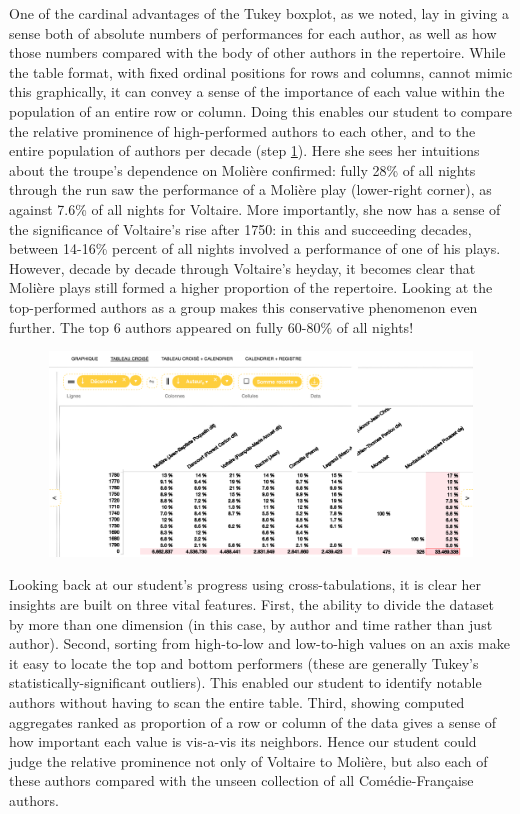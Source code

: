 \documentclass[	DIV=calc,%
							paper=a4,%
							fontsize=11pt,%
							twocolumn]{scrartcl}	 					%
\begin{document}
One of the cardinal advantages of the Tukey boxplot, as we noted, lay in giving a sense both of absolute numbers of performances for each author, as well as how those numbers compared with the body of other authors in the repertoire.  While the table format, with fixed ordinal positions for rows and columns, cannot mimic this graphically, it can convey a sense of the importance of each value within the population of an entire row or column.  Doing this enables our student to compare the relative prominence of high-performed authors to each other, and to the entire population of authors per decade (step \ref{fig:percents}).  Here she sees her intuitions about the troupe’s dependence on Molière confirmed: fully 28\% of all nights through the run saw the performance of a Molière play (lower-right corner), as against 7.6\% of all nights for Voltaire.  More importantly, she now has a sense of the significance of Voltaire’s rise after 1750: in this and succeeding decades, between 14-16\% percent of all nights involved a performance of one of his plays.  However, decade by decade through Voltaire’s heyday, it becomes clear that Molière plays still formed a higher proportion of the repertoire.  Looking at the top-performed authors as a group makes this conservative phenomenon even further.  The top 6 authors appeared on fully 60-80\% of all nights!

\begin{figure}
  \centering
	\includegraphics[width=7in]{steps/percents.png}
	\caption{}
	\label{fig:percents}
\end{figure}

Looking back at our student’s progress using cross-tabulations, it is clear her insights are built on three vital features.  First, the ability to divide the dataset by more than one dimension (in this case, by author and time rather than just author).  Second, sorting from high-to-low and low-to-high values on an axis make it easy to locate the top and bottom performers (these are generally Tukey’s statistically-significant outliers).  This enabled our student to identify notable authors without having to scan the entire table. Third, showing computed aggregates ranked as proportion of a row or column of the data gives a sense of how important each value is vis-a-vis its neighbors.  Hence our student could judge the relative prominence not only of Voltaire to Molière, but also each of these authors compared with the unseen collection of all Comédie-Française authors.
\end{document}
